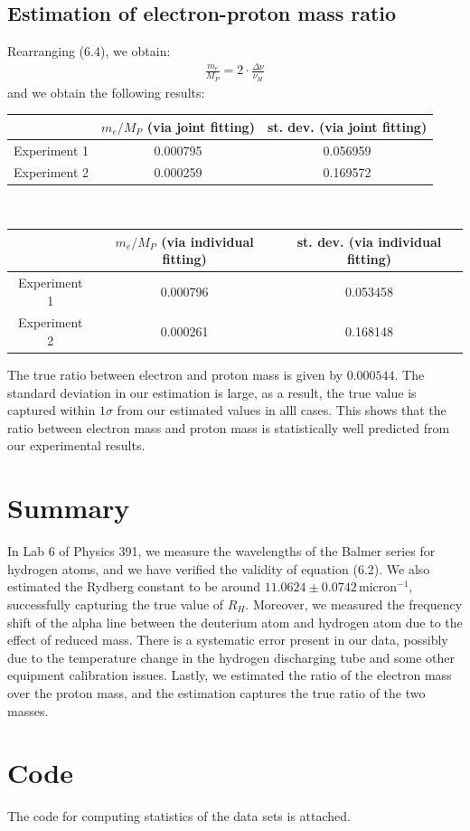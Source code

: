\documentclass[11pt]{book}
\theoremstyle{break}
\theoremstyle{break}
\begin{document}
\subsection{Estimation of electron-proton mass ratio}
Rearranging (6.4), we obtain:
\begin{align*}
\frac{m_e}{M_P} = 2 \cdot \frac{\Delta \nu}{\nu_H}
\end{align*}
and we obtain the following results:
\begin{center}
\begin{tabular}{|c|c|c|}
\hline
& $m_e/M_P$ (via joint fitting) & st. dev. (via joint fitting)\\
\hline
Experiment 1 & 0.000795 & 0.056959 \\
\hline
Experiment 2 & 0.000259 & 0.169572 \\
\hline
\end{tabular}\\
\hfill\break
\hfill\break
\begin{tabular}{|c|c|c|}
\hline
& $m_e/M_P$ (via individual fitting) & st. dev. (via individual fitting)\\
\hline
Experiment 1 & 0.000796 & 0.053458 \\
\hline
Experiment 2 & 0.000261 & 0.168148\\
\hline
\end{tabular}
\end{center}
The true ratio between electron and proton mass is given by $0.000544$. The standard deviation in our estimation is large, as a result, the true value is captured within $1\sigma$ from our estimated values in alll cases. This shows that the ratio between electron mass and proton mass is statistically well predicted from our experimental results. 


\section{Summary}
In Lab 6 of Physics 391, we measure the wavelengths of the Balmer series for hydrogen atoms, and we have verified the validity of equation (6.2). We also estimated the Rydberg constant to be around $11.0624 \pm 0.0742\, \text{micron}^{-1}$, successfully capturing the true value of $R_H$. Moreover, we measured the frequency shift of the alpha line between the deuterium atom and hydrogen atom due to the effect of reduced mass. There is a systematic error present in our data, possibly due to the temperature change in the hydrogen discharging tube and some other equipment calibration issues. Lastly, we estimated the ratio of the electron mass over the proton mass, and the estimation captures the true ratio of the two masses. 



\newpage
\section{Code}
The code for computing statistics of the data sets is attached.
\lstset{style=mystyle}

\end{document}
